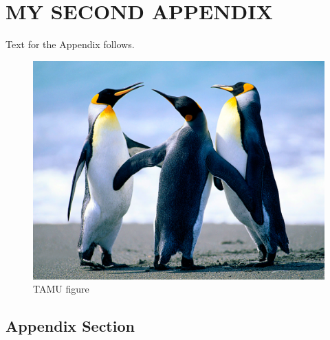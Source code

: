 \chapter{MY SECOND APPENDIX}

Text for the Appendix follows.

\begin{figure}[H]
\centering
\includegraphics[scale=.50]{figures/Penguins.jpg}
\caption{TAMU figure}
\label{fig:tamu-fig6}
\end{figure}

\section{Appendix Section}


\pagebreak{}
